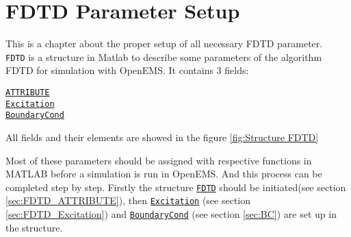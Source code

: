 \chapter{FDTD Parameter Setup}\label{chap:FDTD Parameter Setup}
This is a chapter about the proper setup of all necessary FDTD parameter.\\
\texttt{FDTD}    is a structure in Matlab to describe some parameters of the algorithm FDTD for simulation with OpenEMS. It contains 3 fields:  \label{para:FDTD} %
       \begin{myindentpar}
	      \hyperref[para:FDTD_ATTRIBUTE]{\texttt{ATTRIBUTE}} \\ 
	      \hyperref[para:Excitation]{\texttt{Excitation}}  \\ 
	      \hyperref[para:BoundaryCond]{\texttt{BoundaryCond}}
       \end{myindentpar}
All fields and  their elements  are showed in the figure \ref{fig:Structure FDTD}


  \def\svgwidth{0.8\textwidth}

Most of these parameters should be assigned with respective functions in MATLAB before a simulation is run in OpenEMS. And this process can be completed step by step. Firstly the structure \hyperref[para:FDTD]{\texttt{FDTD}} should be initiated(see section \ref{sec:FDTD_ATTRIBUTE}), then  \hyperref[para:Excitation]{\texttt{Excitation}} (see section \ref{sec:FDTD_Excitation}) and \hyperref[para:BoundaryCond]{\texttt{BoundaryCond}} (see section \ref{sec:BC}) are set up in the structure.%

 

 

 